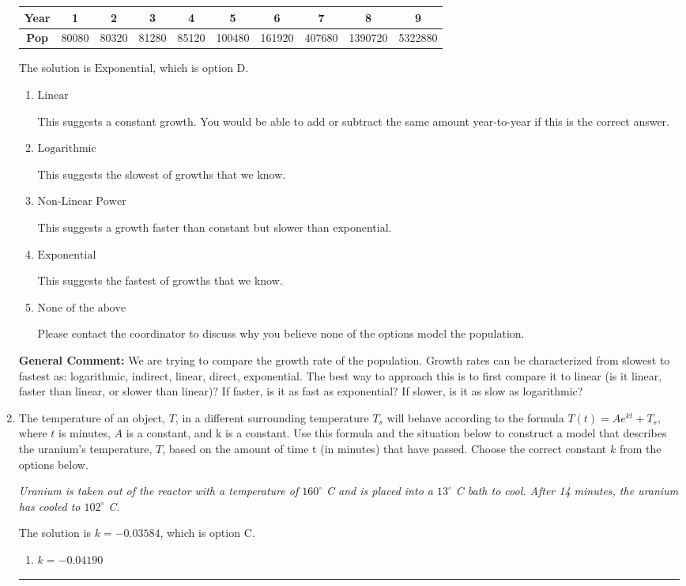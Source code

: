 \documentclass{extbook}[14pt]
\newcommand{\litem}[1]{\item #1

\rule{\textwidth}{0.4pt}}
\begin{document}
\begin{enumerate}
{\begin{tabular}{c|c|c|c|c|c|c|c|c|c}
\textbf{Year} &1 &2 &3 &4 &5 &6 &7 &8 &9\tabularnewline \hline
\textbf{Pop} &80080 &80320 &81280 &85120 &100480 &161920 &407680 &1390720 &5322880\end{tabular}The solution is \( \text{Exponential} \), which is option D.\begin{enumerate}[label=\Alph*.]
\item \( \text{Linear} \)

This suggests a constant growth. You would be able to add or subtract the same amount year-to-year if this is the correct answer.
\item \( \text{Logarithmic} \)

This suggests the slowest of growths that we know.
\item \( \text{Non-Linear Power} \)

This suggests a growth faster than constant but slower than exponential.
\item \( \text{Exponential} \)

This suggests the fastest of growths that we know.
\item \( \text{None of the above} \)

Please contact the coordinator to discuss why you believe none of the options model the population.
\end{enumerate}

\textbf{General Comment:} We are trying to compare the growth rate of the population. Growth rates can be characterized from slowest to fastest as: logarithmic, indirect, linear, direct, exponential. The best way to approach this is to first compare it to linear (is it linear, faster than linear, or slower than linear)? If faster, is it as fast as exponential? If slower, is it as slow as logarithmic?
}
\litem{
The temperature of an object, $T$, in a different surrounding temperature $T_s$ will behave according to the formula $T(t) = Ae^{kt} + T_s$, where $t$ is minutes, $A$ is a constant, and k is a constant. Use this formula and the situation below to construct a model that describes the uranium's temperature, $T$, based on the amount of time t (in minutes) that have passed. Choose the correct constant $k$ from the options below.

\begin{center}
    \textit{ Uranium is taken out of the reactor with a temperature of $160^{\circ}$ C and is placed into a $13^{\circ}$ C bath to cool. After 14 minutes, the uranium has cooled to $102^{\circ}$ C. }
\end{center}
The solution is \( k = -0.03584 \), which is option C.\begin{enumerate}[label=\Alph*.]
\item \( k = -0.04190 \)


\end{enumerate}}
\end{enumerate}
\end{document}
